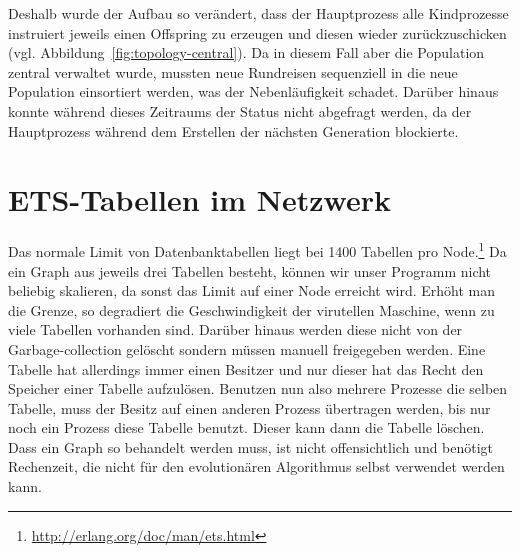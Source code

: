 Deshalb wurde der Aufbau so verändert, dass der Hauptprozess alle
Kindprozesse instruiert jeweils einen Offspring zu erzeugen und diesen
wieder zurückzuschicken (vgl. Abbildung~\ref{fig:topology-central}).
Da in diesem Fall aber die Population zentral verwaltet wurde, mussten
neue Rundreisen sequenziell in die neue Population einsortiert werden,
was der Nebenläufigkeit schadet.  Darüber hinaus konnte während dieses
Zeitraums der Status nicht abgefragt werden, da der Hauptprozess
während dem Erstellen der nächsten Generation blockierte.

\begin{SCfigure}
  \caption[Verteilte Erzeugung von Offsprings]
  {\label{fig:topology-central} Die Kindprozesse erzeugen einzelne
    Rundreisen und schicken diese an den „master“ zurück.  Dieser muss
    die Rundreisen dann in die eigene Population einsortieren.}
\end{SCfigure}

\section{ETS-Tabellen im Netzwerk}
\label{sec:ets}

Das normale Limit von Datenbanktabellen liegt bei
1400 Tabellen pro Node.\footnote{\url{http://erlang.org/doc/man/ets.html}} \hskip2pt Da
ein Graph aus jeweils drei Tabellen besteht, können wir unser Programm
nicht beliebig skalieren, da sonst das Limit auf einer Node erreicht
wird.  Erhöht man die Grenze, so degradiert die Geschwindigkeit der
virutellen Maschine, wenn zu viele Tabellen vorhanden sind.  Darüber
hinaus werden diese nicht von der Garbage-collection gelöscht sondern
müssen manuell freigegeben werden.  Eine Tabelle hat allerdings immer
einen Besitzer und nur dieser hat das Recht den Speicher einer Tabelle
aufzulösen.  Benutzen nun also mehrere Prozesse die selben Tabelle,
muss der Besitz auf einen anderen Prozess übertragen werden, bis nur
noch ein Prozess diese Tabelle benutzt.  Dieser kann dann die Tabelle
löschen.  Dass ein Graph so behandelt werden muss, ist nicht
offensichtlich und benötigt Rechenzeit, die nicht für den
evolutionären Algorithmus selbst verwendet werden kann.
